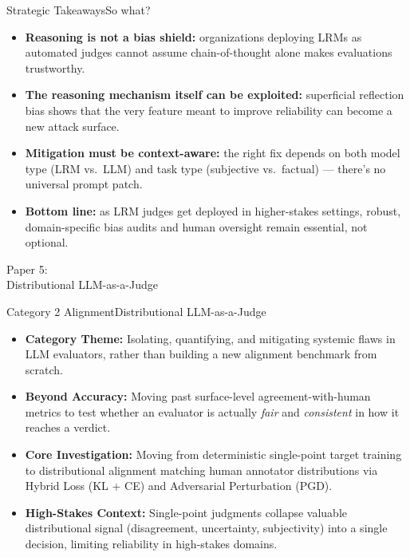 \documentclass[10pt]{beamer}
\begin{document}
	\begin{frame}{Strategic Takeaways}{So what?}
	\begin{itemize}
		\item \textbf{Reasoning is not a bias shield:} organizations deploying LRMs as automated judges cannot assume chain-of-thought alone makes evaluations trustworthy.
		\item \textbf{The reasoning mechanism itself can be exploited:} superficial reflection bias shows that the very feature meant to improve reliability can become a new attack surface.
		\item \textbf{Mitigation must be context-aware:} the right fix depends on both model type (LRM vs.\ LLM) and task type (subjective vs.\ factual) — there's no universal prompt patch.
		\item \textbf{Bottom line:} as LRM judges get deployed in higher-stakes settings, robust, domain-specific bias audits and human oversight remain essential, not optional.
	\end{itemize}
	\end{frame}
	
	\begin{frame}[standout]
		\hypertarget{paper5}{}
		\Large Paper 5:\\Distributional LLM-as-a-Judge
	\end{frame}

	\begin{frame}{Category 2 Alignment}{Distributional LLM-as-a-Judge}
	\begin{itemize}
		\item \textbf{Category Theme:} Isolating, quantifying, and mitigating systemic flaws in LLM evaluators, rather than building a new alignment benchmark from scratch.
		\item \textbf{Beyond Accuracy:} Moving past surface-level agreement-with-human metrics to test whether an evaluator is actually \emph{fair} and \emph{consistent} in how it reaches a verdict.
		\item \textbf{Core Investigation:} Moving from deterministic single-point target training to distributional alignment matching human annotator distributions via Hybrid Loss (KL + CE) and Adversarial Perturbation (PGD).
		\item \textbf{High-Stakes Context:} Single-point judgments collapse valuable distributional signal (disagreement, uncertainty, subjectivity) into a single decision, limiting reliability in high-stakes domains.
	\end{itemize}
	\end{frame}
\end{document}
